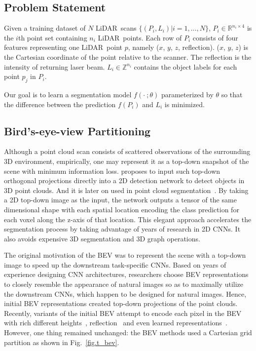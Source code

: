\documentclass[10pt,twocolumn,letterpaper]{article}
\newcommand{\lidar}{\mbox{LiDAR }}
\begin{document}
\subsection{Problem Statement}

Given a training dataset of $N$ \lidar scans $\{(P_i,L_i)|i=1,\ldots,N\}$, $P_i\in\mathbb{R}^{n_i\times4}$ is the $i$th point set containing $n_i$ \lidar points. Each row of $P_i$ consists of four features representing one \lidar point $p$, namely ($x$, $y$, $z$, reflection). ($x$, $y$, $z$) is the Cartesian coordinate of the point relative to the scanner. The reflection is the intensity of returning laser beam. $L_i\in\mathbb{Z}^{n_i}$ contains the object labels for each point $p_j$ in $P_i$.

Our goal is to learn a segmentation model $f(\cdot \ ;\theta)$ parameterized by $\theta$ so that the difference between the prediction $f(P_i)$ and $L_i$ is minimized.


\subsection{Bird's-eye-view Partitioning}

Although a point cloud scan consists of scattered observations of the surrounding 3D environment, empirically, one may represent it as a top-down snapshot of the scene with minimum information loss. \cite{chen2017multi} proposes to input such top-down orthogonal projections directly into a 2D detection network to detect objects in 3D point clouds. And it is later on used in point cloud segmentation~\cite{zhang2018efficient}. By taking a 2D top-down image as the input, the network outputs a tensor of the same dimensional shape with each spatial location encoding the class prediction for each voxel along the z-axis of that location. This elegant approach accelerates the segmentation process by taking advantage of years of research in 2D CNNs. It also avoids expensive 3D segmentation and 3D graph operations.

The original motivation of the BEV was to represent the scene with a top-down image to speed up the downstream task-specific CNNs. Based on years of experience designing CNN architectures, researchers choose BEV representations to closely resemble the appearance of natural images so as to maximally utilize the downstream CNNs, which happen to be designed for natural images. Hence, initial BEV representations created top-down projections of the point clouds. Recently, variants of the initial BEV attempt to encode each pixel in the BEV with rich different heights~\cite{yang2018pixor}, reflection~\cite{simon2018complex} and even learned representations~\cite{lang2019pointpillars}. However, one thing remained unchanged: the BEV methods used a Cartesian grid partition as shown in Fig.~\ref{fig.t_bev}.
\end{document}
